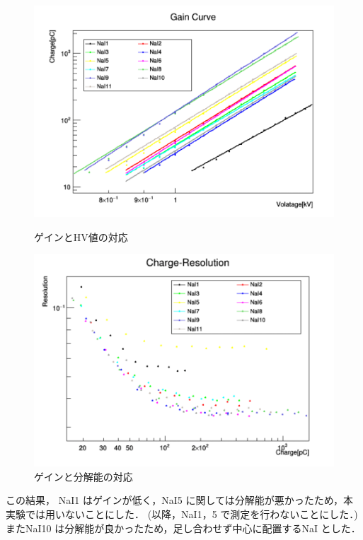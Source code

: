 \begin{figure}[H]
  \begin{minipage}{0.45\hsize}
    \begin{center}\hspace*{-1em}
      \includegraphics[width=1.1\textwidth]{figure/tajima/gain_curve.png}
    \end{center}
    \caption{ゲインとHV値の対応}
    \label{GainHV}
  \end{minipage}
  \hfill
  \begin{minipage}{0.45\hsize}
    \begin{center}
      \includegraphics[width=1.1\textwidth]{figure/tajima/charge_resolution.png}
    \end{center}
    \caption{ゲインと分解能の対応}
    \label{resoHV}
  \end{minipage}
\end{figure}
この結果， NaI1 はゲインが低く，NaI5 に関しては分解能が悪かったため，本実験では用いないことにした．
(以降，NaI1，5 で測定を行わないことにした．)
またNaI10 は分解能が良かったため，足し合わせず中心に配置するNaI とした．


